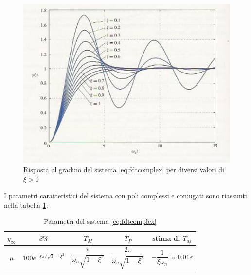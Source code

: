 \documentclass[a4paper]{report}
\begin{document}
\begin{figure}[!h]
  \begin{center}
    \includegraphics[scale=0.5]{./figures/rispscal9.png}
    \caption{Risposta al gradino del sistema \ref{eq:fdtcomplex} per
      diversi valori di $\xi>0$}\label{fig:risp9}
  \end{center}
\end{figure} 

I parametri caratteristici del sistema con poli complessi e coniugati
sono riassunti nella tabella \ref{tab:tabfdtcomplexparms}:
\begin{table}[!hbp]
  \begin{center}
    \begin{tabular}{|c|c|c|c|c|}
      \hline
      $y_\infty$ & $S\%$ & $T_M$ & $T_P$ & stima di $T_{a\varepsilon}$\\
      \hline
      $\mu$ & $100e^{-\xi \pi / \sqrt1-\xi^2}$ & $\dfrac{\pi}{\omega_n
        \sqrt{1-\xi^2}}$ & $\dfrac{2\pi}{\omega_n \sqrt{1-\xi^2}}$ &
      $-\dfrac{1}{\xi \omega_n}\ln0.01\varepsilon$\\
      \hline
    \end{tabular}
  \end{center}
  \caption{Parametri del sistema \ref{eq:fdtcomplex}}
  \label{tab:tabfdtcomplexparms}
\end{table}
\end{document}
